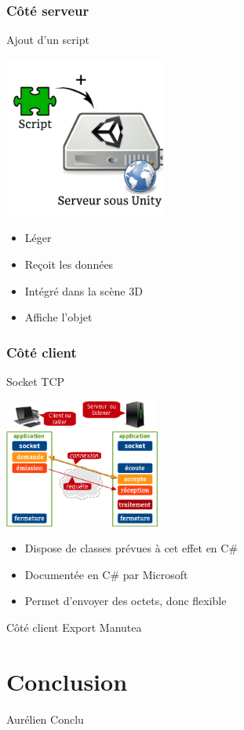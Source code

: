 \documentclass[a4paper,10pt]{beamer}
\begin{document}
	\subsubsection{Côté serveur}
	\begin{frame}{Ajout d'un script}
		\centerline{\includegraphics[height=150pt]{images/network/plugin.png}}
		\begin{itemize}	
			\item \pause Léger \pause
			\item Reçoit les données \pause
			\item Intégré dans la scène 3D \pause
			\item Affiche l'objet 
		\end{itemize}	
		
	\end{frame}
	
	\subsubsection{Côté client}
	
	\begin{frame}{Socket TCP}
		\centerline{\includegraphics[height=120pt]{images/network/tcp-socket.png}}
		
		\begin{itemize}
			\item Dispose de classes prévues à cet effet en C\#
			\item Documentée en C\# par Microsoft
			\item Permet d'envoyer des octets, donc flexible
		\end{itemize}
	\end{frame}
	
	\begin{frame}{Côté client}
		Export Manutea
	\end{frame}
	
	\section{Conclusion}
	
	\begin{frame}
		Aurélien Conclu
	\end{frame}
		
\end{document}
